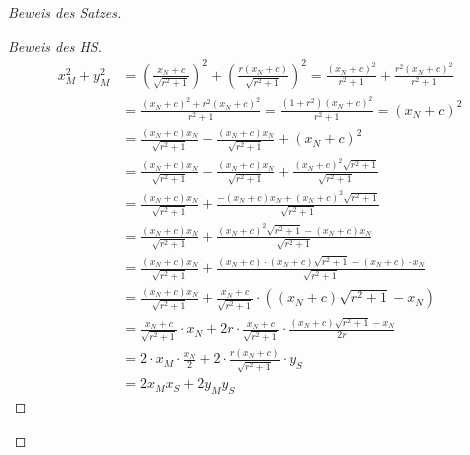 \begin{proof}[Beweis des Satzes]
\begin{proof}[Beweis des HS]
        \begin{align*}
            x_M^2+y_M^2&=\left(\frac{x_N+c}{\sqrt{r^2+1}}\right)^2+\left(\frac{r(x_N+c)}{\sqrt{r^2+1}}\right)^2
            =\frac{(x_N+c)^2}{r^2+1}+\frac{r^2(x_N+c)^2}{r^2+1}\\
            &=\frac{(x_N+c)^2+r^2(x_N+c)^2}{r^2+1}=\frac{(1+r^2)(x_N+c)^2}{r^2+1}=(x_N+c)^2\\
            &=\frac{(x_N+c)x_N}{\sqrt{r^2+1}}-\frac{(x_N+c)x_N}{\sqrt{r^2+1}}+(x_N+c)^2\\
            &=\frac{(x_N+c)x_N}{\sqrt{r^2+1}}-\frac{(x_N+c)x_N}{\sqrt{r^2+1}}+\frac{(x_N+c)^2\sqrt{r^2+1}}{\sqrt{r^2+1}}\\
            &=\frac{(x_N+c)x_N}{\sqrt{r^2+1}}+\frac{-(x_N+c)x_N+(x_N+c)^2\sqrt{r^2+1}}{\sqrt{r^2+1}}\\
            &=\frac{(x_N+c)x_N}{\sqrt{r^2+1}}+\frac{(x_N+c)^2\sqrt{r^2+1}-(x_N+c)x_N}{\sqrt{r^2+1}}\\
            &=\frac{(x_N+c)x_N}{\sqrt{r^2+1}}+\frac{(x_N+c)\cdot(x_N+c)\sqrt{r^2+1}-(x_N+c)\cdot x_N}{\sqrt{r^2+1}}\\
            &=\frac{(x_N+c)x_N}{\sqrt{r^2+1}}+\frac{x_N+c}{\sqrt{r^2+1}}\cdot \left((x_N+c)\sqrt{r^2+1}-x_N\right)\\
            &=\frac{x_N+c}{\sqrt{r^2+1}}\cdot x_N+2r\cdot\frac{x_N+c}{\sqrt{r^2+1}}\cdot\frac{(x_N+c)\sqrt{r^2+1}-x_N}{2r}\\
            &=2\cdot x_M\cdot\frac{x_N}{2}+2\cdot\frac{r(x_N+c)}{\sqrt{r^2+1}}\cdot y_S\\
            &=2x_Mx_S+2y_My_S
        \end{align*}


\end{proof}
\end{proof}
